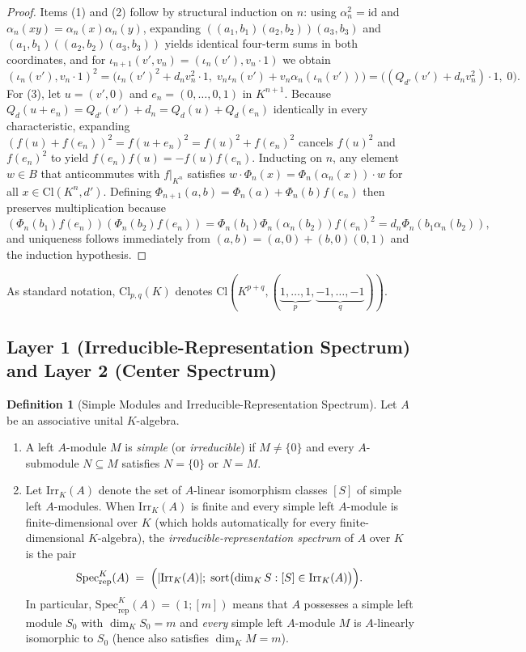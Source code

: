 \documentclass[11pt,a4paper]{article}
\theoremstyle{plain}
\theoremstyle{definition}
\newtheorem{definition}[theorem]{Definition}
\newcommand{\Cl}{\mathrm{Cl}}
\newcommand{\Irr}{\mathrm{Irr}}
\newcommand{\Specrep}{\mathrm{Spec}_{\mathrm{rep}}}
\begin{document}
\begin{proof}
Items (1) and (2) follow by structural induction on $n$: using $\alpha_n^2 = \mathrm{id}$ and $\alpha_n(xy)=\alpha_n(x)\alpha_n(y)$, expanding $((a_1,b_1)(a_2,b_2))(a_3,b_3)$ and $(a_1,b_1)((a_2,b_2)(a_3,b_3))$ yields identical four-term sums in both coordinates, and for $\iota_{n+1}(v', v_n) = (\iota_n(v'), v_n \cdot 1)$ we obtain
\[
  (\iota_n(v'), v_n \cdot 1)^2
  = \bigl(\iota_n(v')^2 + d_n v_n^2 \cdot 1,\; v_n \iota_n(v') + v_n \alpha_n(\iota_n(v'))\bigr)
  = \bigl((Q_{d'}(v') + d_n v_n^2)\cdot 1,\; 0\bigr).
\]
For (3), let $u = (v', 0)$ and $e_n = (0,\dots,0,1)$ in $K^{n+1}$. Because $Q_d(u + e_n) = Q_{d'}(v') + d_n = Q_d(u) + Q_d(e_n)$ identically in every characteristic, expanding $(f(u) + f(e_n))^2 = f(u+e_n)^2 = f(u)^2 + f(e_n)^2$ cancels $f(u)^2$ and $f(e_n)^2$ to yield $f(e_n) f(u) = -f(u) f(e_n)$. Inducting on $n$, any element $w \in B$ that anticommutes with $f|_{K^n}$ satisfies $w \cdot \Phi_n(x) = \Phi_n(\alpha_n(x)) \cdot w$ for all $x \in \Cl(K^n,d')$. Defining $\Phi_{n+1}(a,b) = \Phi_n(a) + \Phi_n(b) f(e_n)$ then preserves multiplication because
\[
  (\Phi_n(b_1) f(e_n))(\Phi_n(b_2) f(e_n))
  = \Phi_n(b_1) \Phi_n(\alpha_n(b_2)) f(e_n)^2
  = d_n \Phi_n(b_1 \alpha_n(b_2)),
\]
and uniqueness follows immediately from $(a,b) = (a,0) + (b,0)(0,1)$ and the induction hypothesis.
\end{proof}

As standard notation, $\Cl_{p,q}(K)$ denotes $\Cl(K^{p+q}, (\underbrace{1,\dots,1}_{p}, \underbrace{-1,\dots,-1}_{q}))$.

\subsection{Layer 1 (Irreducible-Representation Spectrum) and Layer 2 (Center Spectrum)}

\begin{definition}[Simple Modules and Irreducible-Representation Spectrum]\label{def:rep-spec}
Let $A$ be an associative unital $K$-algebra.
\begin{enumerate}
  \item A left $A$-module $M$ is \emph{simple} (or \emph{irreducible}) if $M \neq \{0\}$ and every $A$-submodule $N \subseteq M$ satisfies $N = \{0\}$ or $N = M$.
  \item Let $\Irr_K(A)$ denote the set of $A$-linear isomorphism classes $[S]$ of simple left $A$-modules. When $\Irr_K(A)$ is finite and every simple left $A$-module is finite-dimensional over $K$ (which holds automatically for every finite-dimensional $K$-algebra), the \emph{irreducible-representation spectrum} of $A$ over $K$ is the pair
  \begin{equation}\label{eq:spec-rep}
    \Specrep^K(A) \;=\; \Bigl(|\Irr_K(A)|;\; \mathrm{sort}\bigl(\dim_K S : [S] \in \Irr_K(A)\bigr)\Bigr).
  \end{equation}
  In particular, $\Specrep^K(A) = (1;[m])$ means that $A$ possesses a simple left module $S_0$ with $\dim_K S_0 = m$ and \emph{every} simple left $A$-module $M$ is $A$-linearly isomorphic to $S_0$ (hence also satisfies $\dim_K M = m$).
\end{enumerate}
\end{definition}
\end{document}
